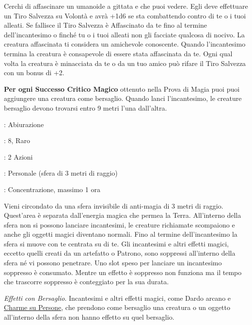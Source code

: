\begin{multicols}{2}
Cerchi di affascinare un umanoide a gittata e che puoi vedere. Egli deve effettuare un Tiro Salvezza su Volontà e avrà +1d6 se sta combattendo contro di te o i tuoi alleati. Se fallisce il Tiro Salvezza è Affascinato da te fino al termine dell'incantesimo o finché tu o i tuoi alleati non gli facciate qualcosa di nocivo. La creatura affascinata ti considera un amichevole conoscente. Quando l'incantesimo termina la creatura è consapevole di essere stata affascinata da te. Ogni qual volta la creatura è minacciata da te o da un tuo amico può rifare il Tiro Salvezza con un bonus di +2.

\textbf{Per ogni Successo Critico Magico} ottenuto nella Prova di Magia puoi puoi aggiungere una creatura come bersaglio. Quando lanci l'incantesimo, le creature bersaglio devono trovarsi entro 9 metri l'una dall'altra.

\noindent\colorbox{OBSSgold!10}{
\begin{minipage}{0.95\linewidth}
\begin{description}[noitemsep, topsep=0pt, parsep=0pt, partopsep=0pt, leftmargin=0cm, labelwidth=1.3cm]
	\item[\textbf{Lista}]: Abiurazione
	\item[\textbf{Livello}]: 8, Raro
	\item[\textbf{Lancio}]: 2 Azioni
	\item[\textbf{Gittata}]: Personale (sfera di 3 metri di raggio)
	\item[\textbf{Durata}]: Concentrazione, massimo 1 ora
\end{description}
\end{minipage}}\smallskip

Vieni circondato da una sfera invisibile di anti-magia di 3 metri di raggio. Quest'area è separata dall'energia magica che permea la Terra. All'interno della sfera non si possono lanciare incantesimi, le creature richiamate scompaiono e anche gli oggetti magici diventano normali. Fino al termine dell'incantesimo la sfera si muove con te centrata su di te. Gli incantesimi e altri effetti magici, eccetto quelli creati da un artefatto o Patrono, sono soppressi all'interno della sfera né vi possono penetrare. Uno slot speso per lanciare un incantesimo soppresso è consumato. Mentre un effetto è soppresso non funziona ma il tempo che trascorre soppresso è conteggiato per la sua durata.

\medskip

\noindent\emph{Effetti con Bersaglio}. Incantesimi e altri effetti magici, come Dardo arcano e \hyperlink{Charme su Persone}{Charme su Persone}, che prendono come bersaglio una creatura o un oggetto all'interno della sfera non hanno effetto su quel bersaglio.


\end{multicols}
